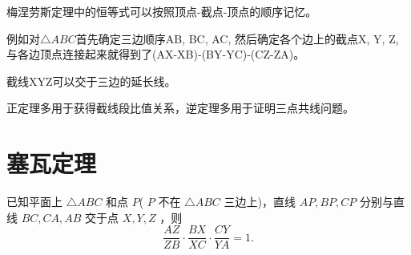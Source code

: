 \begin{remark}
    梅涅劳斯定理中的恒等式可以按照顶点-截点-顶点的顺序记忆。
    
    例如对$\triangle ABC$首先确定三边顺序AB, BC, AC, 然后确定各个边上的截点X, Y, Z, 与各边顶点连接起来就得到了(AX-XB)-(BY-YC)-(CZ-ZA)。

    截线XYZ可以交于三边的延长线。

    正定理多用于获得截线段比值关系，逆定理多用于证明三点共线问题。
\end{remark}


\section{塞瓦定理}
\begin{theorem}[塞瓦(Ceva)定理]
    已知平面上 $\triangle A B C$ 和点 $P$( $P$ 不在 $\triangle A B C$ 三边上)，直线 $A P ,  B P ,  C P$ 分别与直线 $B C ,  C A ,  A B$ 交于点 $X ,  Y ,  Z$ ，则 
    $$\frac{A Z}{Z B} \cdot \frac{B X}{X C} \cdot \frac{C Y}{Y A}=1.$$
\end{theorem}


